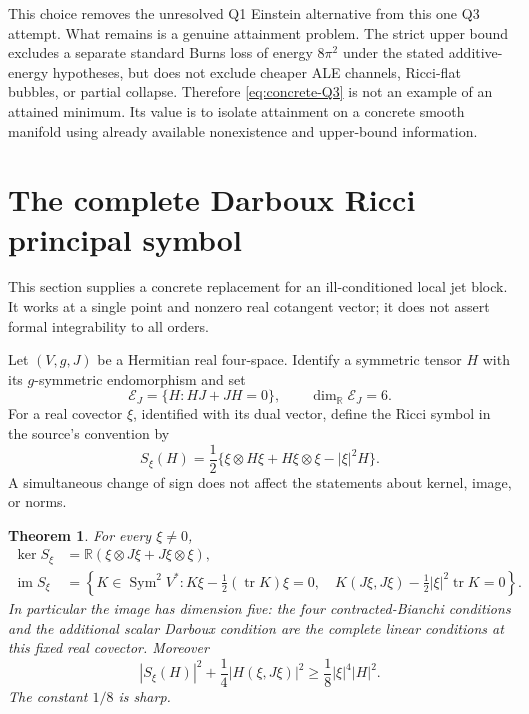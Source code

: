 \documentclass[11pt,a4paper]{article}
\numberwithin{equation}{section}
\newtheorem{theorem}{Theorem}[section]
\theoremstyle{definition}\newtheorem{hypothesis}[theorem]{Input}
\theoremstyle{remark}\newtheorem{remark}[theorem]{Remark}
\newcommand{\tr}{\operatorname{tr}}
\newcommand{\Sym}{\operatorname{Sym}}
\newcommand{\kerop}{\operatorname{ker}}
\newcommand{\imop}{\operatorname{im}}
\begin{document}
This choice removes the unresolved Q1 Einstein alternative from this one
Q3 attempt.  What remains is a genuine attainment problem.  The strict
upper bound excludes a separate standard Burns loss of energy $8\pi^2$
under the stated additive-energy hypotheses, but does not exclude cheaper
ALE channels, Ricci-flat bubbles, or partial collapse.  Therefore
\eqref{eq:concrete-Q3} is not an example of an attained minimum.  Its value
is to isolate attainment on a concrete smooth manifold using already
available nonexistence and upper-bound information.

\section{The complete Darboux Ricci principal symbol}

This section supplies a concrete replacement for an ill-conditioned local
jet block.  It works at a single point and nonzero real cotangent vector;
it does not assert formal integrability to all orders.

Let $(V,g,J)$ be a Hermitian real four-space.  Identify a symmetric tensor
$H$ with its $g$-symmetric endomorphism and set
\[
 \mathcal E_J=\{H:H J+JH=0\},\qquad \dim_\mathbb R\mathcal E_J=6.
\]
For a real covector $\xi$, identified with its dual vector, define the Ricci
symbol in the source's convention by
\begin{equation}\label{eq:Ric-symbol}
 S_\xi(H)=\frac12\{
 \xi\otimes H\xi+H\xi\otimes\xi-|\xi|^2H\}.
\end{equation}
A simultaneous change of sign does not affect the statements about
kernel, image, or norms.

\begin{theorem}\label{thm:symbol}
For every $\xi\ne0$,
\begin{align}
 \kerop S_\xi&=\mathbb R(\xi\otimes J\xi+J\xi\otimes\xi),\label{eq:kernel}\\
 \imop S_\xi&=\left\{K\in\Sym^2V^*:
 K\xi-\tfrac12(\tr K)\xi=0,\quad
 K(J\xi,J\xi)-\tfrac12|\xi|^2\tr K=0\right\}.
 \label{eq:image}
\end{align}
In particular the image has dimension five: the four contracted-Bianchi
conditions and the additional scalar Darboux condition are the complete
linear conditions at this fixed real covector.
Moreover
\begin{equation}\label{eq:coercivity}
 \boxed{|S_\xi(H)|^2+\frac14|H(\xi,J\xi)|^2
 \ge\frac18|\xi|^4|H|^2.}
\end{equation}
The constant $1/8$ is sharp.
\end{theorem}
\end{document}
